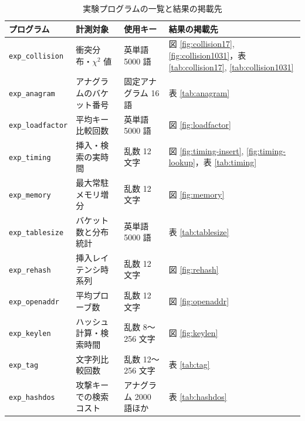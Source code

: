 \begin{table}[htbp]
\centering
\caption{実験プログラムの一覧と結果の掲載先}
\label{tab:explist}
\begin{tabular}{llll}
\hline
プログラム & 計測対象 & 使用キー & 結果の掲載先 \\
\hline
{\tt exp\_collision}  & 衝突分布・$\chi^2$ 値 & 英単語 5000 語 & 図 \ref{fig:collision17}, \ref{fig:collision1031}，表 \ref{tab:collision17}, \ref{tab:collision1031} \\
{\tt exp\_anagram}    & アナグラムのバケット番号 & 固定アナグラム 16 語 & 表 \ref{tab:anagram} \\
{\tt exp\_loadfactor} & 平均キー比較回数 & 英単語 5000 語 & 図 \ref{fig:loadfactor} \\
{\tt exp\_timing}     & 挿入・検索の実時間 & 乱数 12 文字 & 図 \ref{fig:timing-insert}, \ref{fig:timing-lookup}，表 \ref{tab:timing} \\
{\tt exp\_memory}     & 最大常駐メモリ増分 & 乱数 12 文字 & 図 \ref{fig:memory} \\
{\tt exp\_tablesize}  & バケット数と分布統計 & 英単語 5000 語 & 表 \ref{tab:tablesize} \\
{\tt exp\_rehash}     & 挿入レイテンシ時系列 & 乱数 12 文字 & 図 \ref{fig:rehash} \\
{\tt exp\_openaddr}   & 平均プローブ数 & 乱数 12 文字 & 図 \ref{fig:openaddr} \\
{\tt exp\_keylen}     & ハッシュ計算・検索時間 & 乱数 8〜256 文字 & 図 \ref{fig:keylen} \\
{\tt exp\_tag}        & 文字列比較回数 & 乱数 12〜256 文字 & 表 \ref{tab:tag} \\
{\tt exp\_hashdos}    & 攻撃キーでの検索コスト & アナグラム 2000 語ほか & 表 \ref{tab:hashdos} \\
\hline
\end{tabular}
\end{table}
